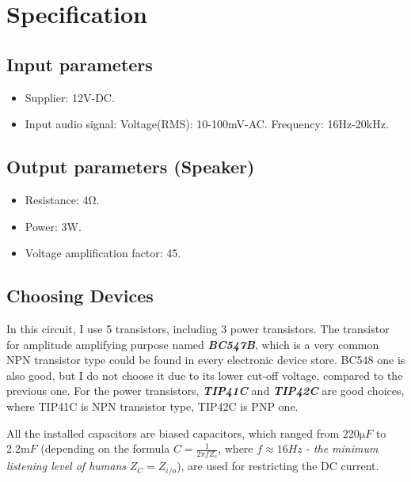\documentclass[twoside, a4paper, leqno]{article}
\begin{document}
	\section{Specification}
	\subsection{Input parameters}
		\begin{itemize}
			\item Supplier: 12V-DC.
			\item Input audio signal:
				\subitem Voltage(RMS): 10-100mV-AC.
				\subitem Frequency: 16Hz-20kHz. 
		\end{itemize}
	\subsection{Output parameters (Speaker)}
		\begin{itemize}
			\item Resistance: 4$\si{\ohm}$.
			\item Power: 3W.
			\item Voltage amplification factor:  45.
		\end{itemize}
	
	\subsection{Choosing Devices}
	In this circuit, I use 5 transistors, including 3 power transistors. The transistor for amplitude amplifying purpose named \textit{\textbf{BC547B}}, which is a very common NPN transistor type could be found in every electronic device store. BC548 one is also good, but I do not choose it due to its lower cut-off voltage, compared to the previous one. For the power transistors, \textit{\textbf{TIP41C}} and \textit{\textbf{TIP42C}} are good choices, where TIP41C is NPN transistor type, TIP42C is PNP one.
	
	All the installed capacitors are biased capacitors, which ranged from $220\si{\micro}F$ to $2.2\si{\milli} F$ (depending on the formula $C = \frac{1}{2\pi f Z_c}$, where $f \approx 16Hz$ - \textit{the minimum listening level of humans} $Z_C = Z_{i/o}$), are used for restricting the DC current.
	
\end{document}
